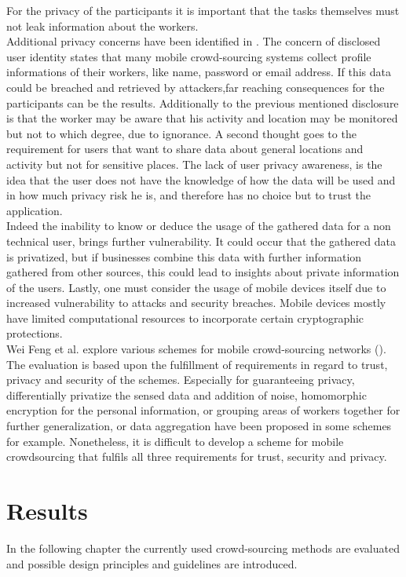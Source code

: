 \documentclass[a4paper,12pt]{report}
\begin{document}
			For the privacy of the participants it is important that the tasks themselves must not leak information about the workers. \\
			Additional privacy concerns have been identified in \cite{PrivacyAwareMCS}. 
			The concern of disclosed user identity states that many mobile crowd-sourcing systems collect profile informations of their workers, like name, password or email address. 
			If this data could be breached and retrieved by attackers,far reaching consequences for the participants can be the results.
			Additionally to the previous mentioned disclosure is that the worker may be aware that his activity and location may be monitored but not to which degree, due to ignorance. 
			A second thought goes to the requirement for users that want to share data about general locations and activity but not for sensitive places. 
			The lack of user privacy awareness, is the idea that the user does not have the knowledge of how the data will be used and in how much privacy risk he is, and therefore has no choice but to trust the application.\\
			Indeed the inability to know or deduce the usage of the gathered data for a non technical user, brings further vulnerability. 
			It could occur that the gathered data is privatized, but if businesses combine this data with further information gathered from other sources, this could lead to insights about private information of the users. 
			Lastly, one must consider the usage of mobile devices itself due to increased vulnerability to attacks and security breaches. 
			Mobile devices mostly have limited computational resources to incorporate certain cryptographic protections.\\
			Wei Feng et al. explore various schemes for mobile crowd-sourcing networks (\cite{SecPriTrustMCS}). 
			The evaluation is based upon the fulfillment of requirements in regard to trust, privacy and security of the schemes. 
			Especially for guaranteeing privacy, differentially privatize the sensed data and addition of noise, homomorphic encryption for the personal information, or grouping areas of workers together for further generalization, or data aggregation have been proposed in some schemes for example. 
			Nonetheless, it is difficult to develop a scheme for mobile crowdsourcing that fulfils all three requirements for trust, security and privacy.
		\closesection
	\closesection


	\chapter{Results} \label{Results}
	In the following chapter the currently used crowd-sourcing methods are evaluated and possible design principles and guidelines are introduced.
	
\end{document}
